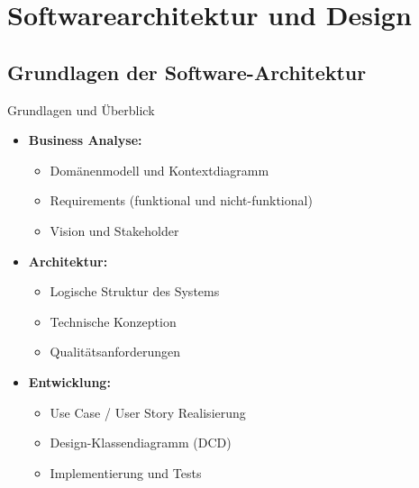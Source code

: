 \section{Softwarearchitektur und Design}

\subsection{Grundlagen der Software-Architektur}

\begin{concept}{Grundlagen und Überblick}
\begin{itemize}
    \item \textbf{Business Analyse:}
    \begin{itemize}
        \item Domänenmodell und Kontextdiagramm
        \item Requirements (funktional und nicht-funktional)
        \item Vision und Stakeholder
    \end{itemize}
    
    \item \textbf{Architektur:}
    \begin{itemize}
        \item Logische Struktur des Systems
        \item Technische Konzeption
        \item Qualitätsanforderungen
    \end{itemize}
    
    \item \textbf{Entwicklung:}
    \begin{itemize}
        \item Use Case / User Story Realisierung
        \item Design-Klassendiagramm (DCD)
        \item Implementierung und Tests
    \end{itemize}
\end{itemize}


\end{concept}
